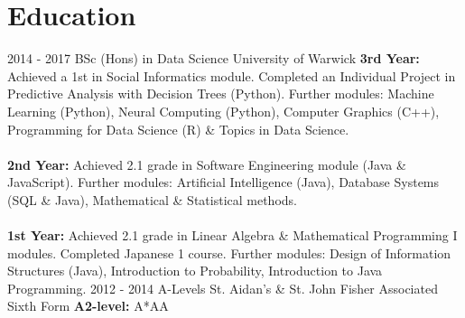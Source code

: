 \documentclass[]{friggeri-cv}
\begin{document}
\section{Education}
\begin{entrylist}
  \entry %
    {2014 - 2017}
    {BSc (Hons) in Data Science}
    {University of Warwick}
    {\textbf{3rd Year:} Achieved a 1st in Social Informatics module. Completed an Individual Project in Predictive Analysis with Decision Trees (Python). Further modules: Machine Learning (Python), Neural Computing (Python), Computer Graphics (C++), Programming for Data Science (R) \& Topics in Data Science.\\\\
    \textbf{2nd Year:} Achieved 2.1 grade in Software Engineering module (Java \& JavaScript). Further modules: Artificial Intelligence (Java), Database Systems (SQL \& Java), Mathematical \& Statistical methods.\\\\
    \textbf{1st Year:} Achieved 2.1 grade in Linear Algebra \& Mathematical Programming I modules. Completed Japanese 1 course. Further modules: Design of Information Structures (Java), Introduction to Probability, Introduction to Java Programming.}
  \entry %
    {2012 - 2014}
    {A-Levels}
    {St. Aidan's \& St. John Fisher Associated Sixth Form}
    {\textbf{A2-level:} A*AA}
\end{entrylist}
\end{document}
